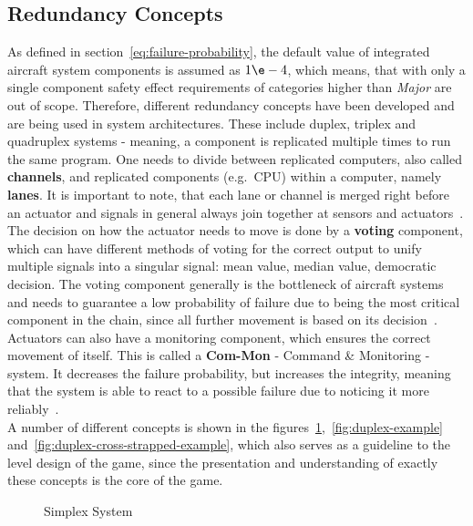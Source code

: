\subsection{Redundancy Concepts}\label{subsec:redundancy-concepts}
As defined in section~\ref{eq:failure-probability}, the default value of integrated aircraft system components is assumed as
$1\e-4$, which means, that with only a single component safety effect requirements of categories higher than \textit{Major} are out of scope.
Therefore, different redundancy concepts have been developed and are being used in system architectures.
These include duplex, triplex and quadruplex systems - meaning, a component is replicated multiple times to run the same program.
One needs to divide between replicated computers, also called \textbf{channels}, and replicated components (e.g.\ CPU) within a computer,
namely \textbf{lanes}.
It is important to note, that each lane or channel is merged right before an actuator and signals in general always join together
at sensors and actuators~\cite{lfs1}.
\\
The decision on how the actuator needs to move is done by a \textbf{voting} component, which can have different methods of voting
for the correct output to unify multiple signals into a singular signal: mean value, median value, democratic decision.
The voting component generally is the bottleneck of aircraft systems and needs to guarantee a low probability of failure
due to being the most critical component in the chain, since all further movement is based on its decision~\cite{lfs1}.
\\
Actuators can also have a monitoring component, which ensures the correct movement of itself.
This is called a \textbf{Com-Mon} - Command \& Monitoring - system.
It decreases the failure probability, but increases the integrity, meaning that the system is able to react to a possible failure due
to noticing it more reliably~\cite{lfs1}.
\\
A number of different concepts is shown in the figures~\ref{fig:simplex-example},~\ref{fig:duplex-example} and~\ref{fig:duplex-cross-strapped-example},
which also serves as a guideline to the level design of the game,
since the presentation and understanding of exactly these concepts is the core of the game.
\begin{figure}
    \begin{center}
    \end{center}
    \caption{Simplex System}
    \label{fig:simplex-example}
\end{figure}
